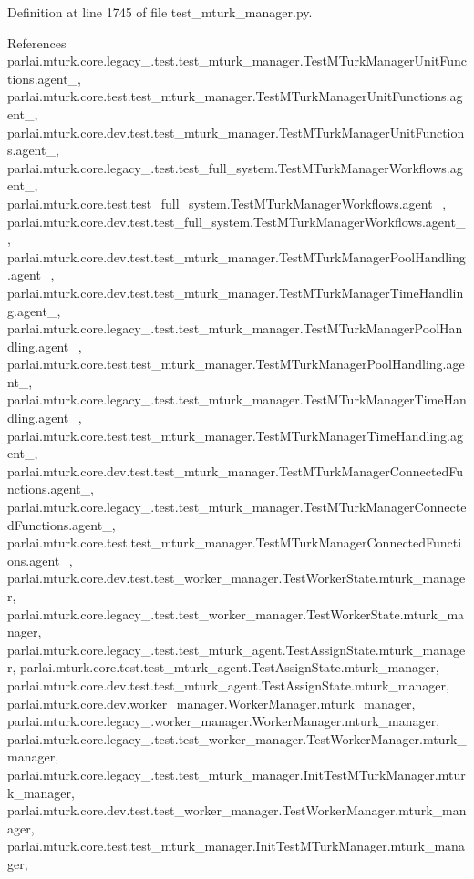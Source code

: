 Definition at line 1745 of file test\+\_\+mturk\+\_\+manager.\+py.



References parlai.\+mturk.\+core.\+legacy\+\_.\+test.\+test\+\_\+mturk\+\_\+manager.\+Test\+M\+Turk\+Manager\+Unit\+Functions.\+agent\+\_, parlai.\+mturk.\+core.\+test.\+test\+\_\+mturk\+\_\+manager.\+Test\+M\+Turk\+Manager\+Unit\+Functions.\+agent\+\_, parlai.\+mturk.\+core.\+dev.\+test.\+test\+\_\+mturk\+\_\+manager.\+Test\+M\+Turk\+Manager\+Unit\+Functions.\+agent\+\_, parlai.\+mturk.\+core.\+legacy\+\_.\+test.\+test\+\_\+full\+\_\+system.\+Test\+M\+Turk\+Manager\+Workflows.\+agent\+\_, parlai.\+mturk.\+core.\+test.\+test\+\_\+full\+\_\+system.\+Test\+M\+Turk\+Manager\+Workflows.\+agent\+\_, parlai.\+mturk.\+core.\+dev.\+test.\+test\+\_\+full\+\_\+system.\+Test\+M\+Turk\+Manager\+Workflows.\+agent\+\_, parlai.\+mturk.\+core.\+dev.\+test.\+test\+\_\+mturk\+\_\+manager.\+Test\+M\+Turk\+Manager\+Pool\+Handling.\+agent\+\_, parlai.\+mturk.\+core.\+dev.\+test.\+test\+\_\+mturk\+\_\+manager.\+Test\+M\+Turk\+Manager\+Time\+Handling.\+agent\+\_, parlai.\+mturk.\+core.\+legacy\+\_.\+test.\+test\+\_\+mturk\+\_\+manager.\+Test\+M\+Turk\+Manager\+Pool\+Handling.\+agent\+\_, parlai.\+mturk.\+core.\+test.\+test\+\_\+mturk\+\_\+manager.\+Test\+M\+Turk\+Manager\+Pool\+Handling.\+agent\+\_, parlai.\+mturk.\+core.\+legacy\+\_.\+test.\+test\+\_\+mturk\+\_\+manager.\+Test\+M\+Turk\+Manager\+Time\+Handling.\+agent\+\_, parlai.\+mturk.\+core.\+test.\+test\+\_\+mturk\+\_\+manager.\+Test\+M\+Turk\+Manager\+Time\+Handling.\+agent\+\_, parlai.\+mturk.\+core.\+dev.\+test.\+test\+\_\+mturk\+\_\+manager.\+Test\+M\+Turk\+Manager\+Connected\+Functions.\+agent\+\_, parlai.\+mturk.\+core.\+legacy\+\_.\+test.\+test\+\_\+mturk\+\_\+manager.\+Test\+M\+Turk\+Manager\+Connected\+Functions.\+agent\+\_, parlai.\+mturk.\+core.\+test.\+test\+\_\+mturk\+\_\+manager.\+Test\+M\+Turk\+Manager\+Connected\+Functions.\+agent\+\_, parlai.\+mturk.\+core.\+dev.\+test.\+test\+\_\+worker\+\_\+manager.\+Test\+Worker\+State.\+mturk\+\_\+manager, parlai.\+mturk.\+core.\+legacy\+\_.\+test.\+test\+\_\+worker\+\_\+manager.\+Test\+Worker\+State.\+mturk\+\_\+manager, parlai.\+mturk.\+core.\+legacy\+\_.\+test.\+test\+\_\+mturk\+\_\+agent.\+Test\+Assign\+State.\+mturk\+\_\+manager, parlai.\+mturk.\+core.\+test.\+test\+\_\+mturk\+\_\+agent.\+Test\+Assign\+State.\+mturk\+\_\+manager, parlai.\+mturk.\+core.\+dev.\+test.\+test\+\_\+mturk\+\_\+agent.\+Test\+Assign\+State.\+mturk\+\_\+manager, parlai.\+mturk.\+core.\+dev.\+worker\+\_\+manager.\+Worker\+Manager.\+mturk\+\_\+manager, parlai.\+mturk.\+core.\+legacy\+\_.\+worker\+\_\+manager.\+Worker\+Manager.\+mturk\+\_\+manager, parlai.\+mturk.\+core.\+legacy\+\_.\+test.\+test\+\_\+worker\+\_\+manager.\+Test\+Worker\+Manager.\+mturk\+\_\+manager, parlai.\+mturk.\+core.\+legacy\+\_.\+test.\+test\+\_\+mturk\+\_\+manager.\+Init\+Test\+M\+Turk\+Manager.\+mturk\+\_\+manager, parlai.\+mturk.\+core.\+dev.\+test.\+test\+\_\+worker\+\_\+manager.\+Test\+Worker\+Manager.\+mturk\+\_\+manager, parlai.\+mturk.\+core.\+test.\+test\+\_\+mturk\+\_\+manager.\+Init\+Test\+M\+Turk\+Manager.\+mturk\+\_\+manager, 